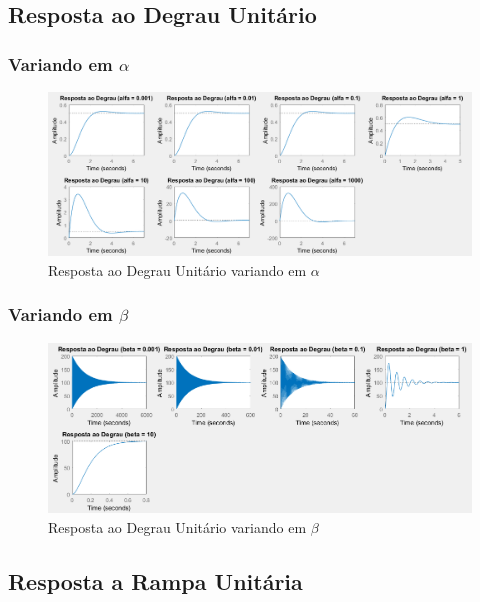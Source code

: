 \documentclass[a4paper, 12pt]{article}
\begin{document}
		\subsection{Resposta ao Degrau Unitário}
			\subsubsection{Variando em $\alpha$}
			\begin{figure}[!ht]
				\centering
				\includegraphics[scale=0.45]{img/3d_alfa.png}
				\caption{Resposta ao Degrau Unitário variando em $\alpha$}
			\end{figure}
			\subsubsection{Variando em $\beta$}
			\begin{figure}[!ht]
				\centering
				\includegraphics[scale=0.5]{img/3d_beta.png}
				\caption{Resposta ao Degrau Unitário variando em $\beta$}
			\end{figure}
    	\newpage
		\subsection{Resposta a Rampa Unitária}
\end{document}

